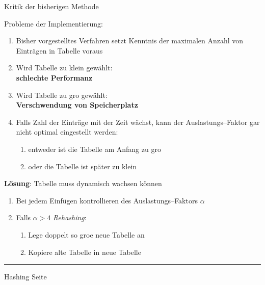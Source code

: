 \begin{slide}{}
\normalsize

\begin{center}
Kritik der bisherigen Methode
\end{center}
\vspace*{0.5cm}

\footnotesize
Probleme der Implementierung:
\begin{enumerate}
\item Bisher vorgestelltes Verfahren setzt Kenntnis 
      der maximalen Anzahl von Eintr\"agen in Tabelle voraus
\item Wird Tabelle zu klein gew\"ahlt: \\[0.3cm]
      \hspace*{1.3cm} \textbf{schlechte Performanz}
\item Wird Tabelle zu gro\3 gew\"ahlt: \\[0.3cm]
      \hspace*{1.3cm} \textbf{Verschwendung von Speicherplatz}
\item Falls Zahl der Eintr\"age mit der Zeit w\"achst, kann
      der Auslastungs--Faktor gar nicht optimal eingestellt werden:
      \begin{enumerate}
      \item entweder ist die Tabelle am Anfang zu gro\3
      \item oder die Tabelle ist sp\"ater zu klein
      \end{enumerate}
\end{enumerate}

\textbf{L\"osung}: Tabelle muss dynamisch wachsen k\"onnen
\begin{enumerate}
\item Bei jedem Einf\"ugen kontrollieren des Auslastungs--Faktors $\alpha$
\item Falls $\alpha > 4$ \emph{Rehashing}: 
  \begin{enumerate}
  \item Lege doppelt so gro\3e neue Tabelle an
  \item Kopiere alte Tabelle in neue Tabelle
  \end{enumerate}
\end{enumerate}


\vspace*{\fill}
\tiny \addtocounter{mypage}{1}
\rule{17cm}{1mm}
Hashing  \hspace*{\fill} Seite 
\end{slide}

